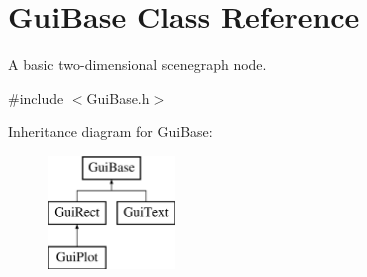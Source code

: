\hypertarget{class_gui_base}{\section{Gui\-Base Class Reference}
\label{class_gui_base}
}


A basic two-\/dimensional scenegraph node.  




{\ttfamily \#include $<$Gui\-Base.\-h$>$}

Inheritance diagram for Gui\-Base\-:\begin{figure}[H]
\begin{center}
\leavevmode
\includegraphics[height=3.000000cm]{class_gui_base}
\end{center}
\end{figure}
